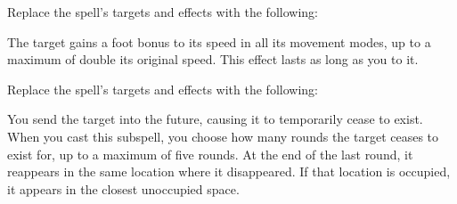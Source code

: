 


Replace the spell's targets and effects with the following:
\begin{spellcontent}

\begin{augmenttargetinginfo}



\end{augmenttargetinginfo}


\begin{augmenteffects}



\spelleffect
The target gains a  foot bonus to its speed in all its movement modes, up to a maximum of double its original speed.
This effect lasts as long as you  to it.








\end{augmenteffects}

\end{spellcontent}








Replace the spell's targets and effects with the following:
\begin{spellcontent}

\begin{augmenttargetinginfo}



\end{augmenttargetinginfo}


\begin{augmenteffects}



\spelleffect
You send the target into the future, causing it to temporarily cease to exist.
When you cast this subspell, you choose how many rounds the target ceases to exist for, up to a maximum of five rounds.
At the end of the last round, it reappears in the same location where it disappeared.
If that location is occupied, it appears in the closest unoccupied space.








\end{augmenteffects}

\end{spellcontent}





